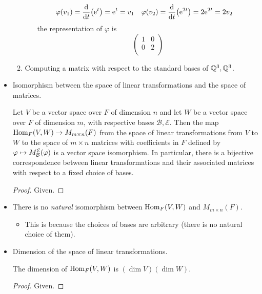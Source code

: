 \documentclass[../notes.tex]{subfiles}
\begin{document}
\begin{itemize}
\begin{enumerate}
\begin{itemize}
\begin{align*}
                \varphi(v_1) &= \dv{t}(\e[t]) = \e[t] = v_1&
                \varphi(v_2) &= \dv{t}(\e[2t]) = 2\e[2t] = 2v_2
            \end{align*}
            the representation of $\varphi$ is
            \begin{equation*}
                \begin{pmatrix}
                    1 & 0\\
                    0 & 2\\
                \end{pmatrix}
            \end{equation*}
        \end{itemize}
        \item Computing a matrix with respect to the standard bases of $\Q^3,\Q^3$.
    \end{enumerate}
    \item Isomorphism between the space of linear transformations and the space of matrices.
    \begin{theorem}\label{trm:11.10}
        Let $V$ be a vector space over $F$ of dimension $n$ and let $W$ be a vector space over $F$ of dimension $m$, with respective bases $\mathcal{B},\mathcal{E}$. Then the map $\Hom_F(V,W)\to M_{m\times n}(F)$ from the space of linear transformations from $V$ to $W$ to the space of $m\times n$ matrices with coefficients in $F$ defined by $\varphi\mapsto\mat{B}{E}{\varphi}$ is a vector space isomorphism. In particular, there is a bijective correspondence between linear transformations and their associated matrices with respect to a fixed choice of bases.
        \begin{proof}
            Given.
        \end{proof}
    \end{theorem}
    \item There is no \emph{natural} isomorphism between $\Hom_F(V,W)$ and $M_{m\times n}(F)$.
    \begin{itemize}
        \item This is because the choices of bases are arbitrary (there is no natural choice of them).
    \end{itemize}
    \item Dimension of the space of linear transformations.
    \begin{corollary}\label{cly:11.11}
        The dimension of $\Hom_F(V,W)$ is $(\dim V)(\dim W)$.
        \begin{proof}
            Given.
        \end{proof}

\end{corollary}
\end{itemize}
\end{document}
